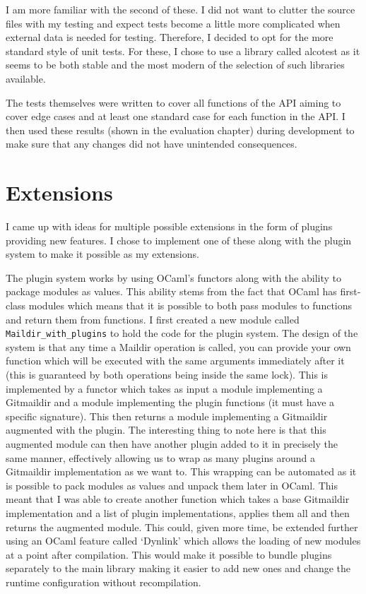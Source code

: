 I am more familiar with the second of these. I did not want to clutter the source files with my testing and expect tests become a little more complicated when external data is needed for testing. Therefore, I decided to opt for the more standard style of unit tests. For these, I chose to use a library called alcotest\cite{code_alcotest} as it seems to be both stable and the most modern of the selection of such libraries available.

The tests themselves were written to cover all functions of the API aiming to cover edge cases and at least one standard case for each function in the API. I then used these results (shown in the evaluation chapter) during development to make sure that any changes did not have unintended consequences.

\section{Extensions} \label{section:extensions}

I came up with ideas for multiple possible extensions in the form of plugins providing new features. I chose to implement one of these along with the plugin system to make it possible as my extensions.

The plugin system works by using OCaml's functors along with the ability to package modules as values. This ability stems from the fact that OCaml has first-class modules which means that it is possible to both pass modules to functions and return them from functions. I first created a new module called \texttt{Maildir\_with\_plugins} to hold the code for the plugin system. The design of the system is that any time a Maildir operation is called, you can provide your own function which will be executed with the same arguments immediately after it (this is guaranteed by both operations being inside the same lock). This is implemented by a functor which takes as input a module implementing a Gitmaildir and a module implementing the plugin functions (it must have a specific signature). This then returns a module implementing a Gitmaildir augmented with the plugin. The interesting thing to note here is that this augmented module can then have another plugin added to it in precisely the same manner, effectively allowing us to wrap as many plugins around a Gitmaildir implementation as we want to. This wrapping can be automated as it is possible to pack modules as values and unpack them later in OCaml. This meant that I was able to create another function which takes a base Gitmaildir implementation and a list of plugin implementations, applies them all and then returns the augmented module. This could, given more time, be extended further using an OCaml feature called `Dynlink' which allows the loading of new modules at a point after compilation. This would make it possible to bundle plugins separately to the main library making it easier to add new ones and change the runtime configuration without recompilation.

